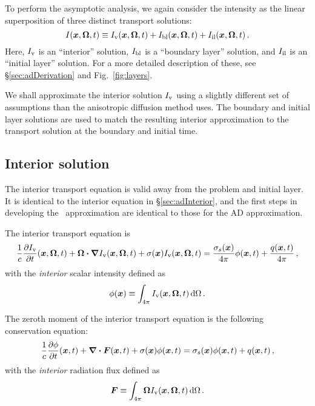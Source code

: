To perform the asymptotic analysis, we again consider the intensity as the
linear superposition of three distinct transport solutions:
\begin{equation} \tagref{eq:tdSuperposition}
  I(\vec{x},\vec{\Omega},t)
  \equiv \Iv(\vec{x},\vec{\Omega},t)
  + \Ibl(\vec{x},\vec{\Omega},t)
  + \Iil(\vec{x},\vec{\Omega},t)\,.
\end{equation}
Here, $I_\mathrm{v}$ is an ``interior'' solution, $I_\mathrm{bl}$ is a ``boundary layer'' solution,
and $I_\mathrm{il}$ is an ``initial layer'' solution. For a more detailed description of
these, see \S\ref{sec:adDerivation} and Fig.~\ref{fig:layers}.

We shall approximate the interior solution $I_\mathrm{v}$ using a slightly different set
of assumptions than the anisotropic diffusion method uses. The boundary and
initial layer solutions are used to match the resulting interior approximation
to the transport solution at the boundary and initial time.

\subsection{Interior solution}

The interior transport equation is valid away from the problem and initial
layer. It is identical to the interior equation in \S\ref{sec:adInterior}, and
the first steps in developing the \APone\ approximation are identical to those
for the AD approximation.

The interior transport equation is
\begin{equation} \tagref{eq:tdVol}
  \frac{1}{c}\pder{\Iv}{t}(\vec{x},\vec{\Omega},t)
  + \vec{\Omega}\vd \grad \Iv(\vec{x},\vec{\Omega},t)
  + \sigma(\vec{x}) \Iv(\vec{x},\vec{\Omega},t)
  = \frac{\sigma_s(\vec{x})}{4\pi}
  \phi(\vec{x},t) + \frac{q(\vec{x},t)}{4\pi} \,,
\end{equation}
with the \emph{interior} scalar intensity defined as
\begin{equation} \tagref{eq:tdPhi}
  \phi(\vec{x}) \equiv \int_{4\pi} \Iv(\vec{x}, \vec{\Omega},t) \ud \Omega\,.
\end{equation}

The zeroth moment of the interior transport equation is the following
conservation equation:
\begin{equation} \tagref{eq:loVol}
\frac{1}{c} \pder{\phi}{t} (\vec{x}, t)
  + \grad \vd\vec{F}(\vec{x}, t)
  + \sigma(\vec{x}) \phi(\vec{x}, t)
 = \sigma_s(\vec{x}) \phi(\vec{x},t) + q(\vec{x},t)\,,
\end{equation}
with the \emph{interior} radiation flux defined as
\begin{equation}\tagref{eq:tdF}
  \vec{F} \equiv \int_{4\pi} \vec{\Omega} \Iv(\vec{x}, \vec{\Omega},t) \ud
  \Omega\,.
\end{equation}

